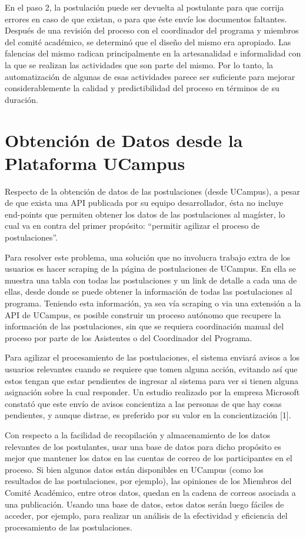 En el paso 2, la postulación puede ser devuelta al postulante para que corrija
errores en caso de que existan, o para que éste envíe los documentos faltantes.
Después de una revisión del proceso con el coordinador del programa y miembros
del comité académico, se determinó que el diseño del mismo era apropiado. Las
falencias del mismo radican principalmente en la artesanalidad e informalidad
con la que se realizan las actividades que son parte del mismo. Por lo tanto, la
automatización de algunas de esas actividades parece ser suficiente para mejorar
considerablemente la calidad y predictibilidad del proceso en términos de su
duración.

\section{Obtención de Datos desde la Plataforma UCampus}

Respecto de la obtención de datos de las postulaciones (desde UCampus), a pesar
de que exista una API publicada por su equipo desarrollador, ésta no incluye
end-points que permiten obtener los datos de las postulaciones al magíster, lo
cual va en contra del primer propósito: “permitir agilizar el proceso de
postulaciones”. 

Para resolver este problema, una solución que no involucra trabajo extra de los
usuarios es hacer scraping de la página de postulaciones de UCampus. En ella se
muestra una tabla con todas las postulaciones y un link de detalle a cada una de
ellas, desde donde se puede obtener la información de todas las postulaciones al
programa. Teniendo esta información, ya sea vía scraping o via una extensión a
la API de UCampus, es posible construir un proceso autónomo que recupere la
información de las postulaciones, sin que se requiera coordinación manual del
proceso por parte de los Asistentes o del Coordinador del Programa.

Para agilizar el procesamiento de las postulaciones, el sistema enviará avisos a
los usuarios relevantes cuando se requiere que tomen alguna acción, evitando así
que estos tengan que estar pendientes de ingresar al sistema para ver si tienen
alguna asignación sobre la cual responder. Un estudio realizado por la empresa
Microsoft constató que este envío de avisos concientiza a las personas de que
hay cosas pendientes, y aunque distrae, es preferido por su valor en la
concientización [1].

Con respecto a la facilidad de recopilación y almacenamiento de los datos
relevantes de los postulantes, usar una base de datos para dicho propósito es
mejor que mantener los datos en las cuentas de correo de los participantes en el
proceso. Si bien algunos datos están disponibles en UCampus (como los resultados
de las postulaciones, por ejemplo), las opiniones de los Miembros del Comité
Académico, entre otros datos, quedan en la cadena de correos asociada a una
publicación. Usando una base de datos, estos datos serán luego fáciles de
acceder, por ejemplo, para realizar un análisis de la efectividad y eficiencia
del procesamiento de las postulaciones.

